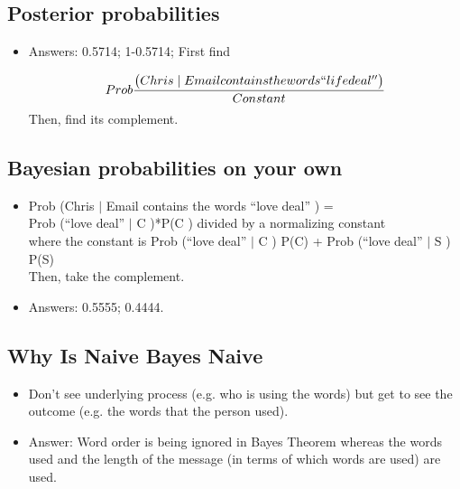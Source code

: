 \documentclass[12pt]{report}
\begin{document}
\subsection{Posterior probabilities}

\begin{itemize}

\item Answers: 0.5714; 1-0.5714; First find 

\begin{equation}
Prob \frac{\big(Chris \mid Email contains the words ``life deal'' \big)}{Constant}
\end{equation}
Then, find its complement. 

\end{itemize}

\subsection{Bayesian probabilities on your own}

\begin{itemize}
\item Prob \big(Chris $\mid$ Email contains the words ``love deal'' \big) = \\

Prob \big(``love deal'' $\mid$ C \big)*P\big(C \big) divided by a normalizing constant \\ 

where the constant is Prob \big(``love deal'' $\mid$ C \big) P\big(C) + Prob \big(``love deal'' $\mid$ S \big) P\big(S) \\

Then, take the complement.

\item Answers: 0.5555; 0.4444. 

\end{itemize}

\subsection{Why Is Naive Bayes Naive}

\begin{itemize}

\item Don't see underlying process (e.g. who is using the words) but get to see the outcome (e.g. the words that the person used). 

\item Answer: Word order is being ignored in Bayes Theorem whereas the words used and the length of the message (in terms of which words are used) are used. 

\end{itemize} 
\end{document}
